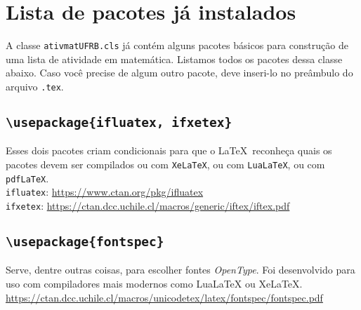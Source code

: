 \section{Lista de pacotes já instalados}\label{pacotes}

A classe \texttt{ativmatUFRB.cls} já contém alguns pacotes básicos para 
construção de uma lista de atividade em matemática.
Listamos todos os pacotes dessa classe abaixo.
Caso você precise de algum outro pacote, deve inseri-lo no preâmbulo do arquivo
\texttt{.tex}.

\subsection*{\texttt{\textbackslash usepackage\{ifluatex, ifxetex\}}} 
Esses dois pacotes criam condicionais para que o \LaTeX\ reconheça quais os 
pacotes devem ser compilados ou com \texttt{XeLaTeX}, ou com \texttt{LuaLaTeX},
ou com \texttt{pdfLaTeX}.\\
\texttt{ifluatex}: { \small \url{https://www.ctan.org/pkg/ifluatex} }\\
\texttt{ifxetex}: { \small \url{https://ctan.dcc.uchile.cl/macros/generic/iftex/iftex.pdf} } 

\subsection*{\texttt{\textbackslash usepackage\{fontspec\}}} 
Serve, dentre outras coisas, para escolher fontes \textit{OpenType}.
Foi desenvolvido para uso com compiladores mais modernos como LuaLaTeX ou 
XeLaTeX.\\
{\small \url{https://ctan.dcc.uchile.cl/macros/unicodetex/latex/fontspec/fontspec.pdf}}

